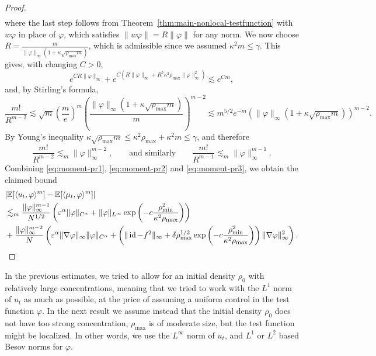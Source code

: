 \documentclass[a4paper,12pt]{article}
\begin{document}
\begin{proof}
\begin{align}
\end{align}
where the last step follows from Theorem~\ref{thm:main-nonlocal-testfunction} with $w\varphi$ in place of $\varphi$, which satisfies $\|w\varphi\| = R \|\varphi\|$ for any norm. We now choose $R = \tfrac{m}{\|\varphi\|_\infty(1+\kappa\sqrt{\rho_{\max}m})}$, which is admissible since we assumed $\kappa^2 m \leq \gamma$. This gives, with changing $C>0$,
\begin{equation}\label{eq:moment-pr2}
    e^{C R\| \varphi \|_{\infty}} + e^{C (R\| \varphi \|_{\infty} + R^2\kappa^2 \rho_{\max}\| \varphi \|_{\infty}^2 )} \lesssim e^{C m},
\end{equation}
and, by Stirling's formula,
\[
    \frac{m!}{R^{m-2}} \lesssim \sqrt{m} \left(\frac{m}{e}\right)^m\left(\frac{\|\varphi\|_\infty(1+\kappa\sqrt{\rho_{\max}m})}{m}\right)^{m-2} \lesssim m^{5/2} e^{-m} (\|\varphi\|_\infty(1+\kappa\sqrt{\rho_{\max}m}))^{m-2}.
\]
By Young's inequality $\kappa \sqrt{\rho_{\max} m} \leq \kappa^2 \rho_{\max} + \kappa^2 m \leq \gamma$,   
and therefore
\begin{equation}\label{eq:moment-pr3}
    \frac{m!}{R^{m-2}} \lesssim_m \|\varphi\|_\infty^{m-2},\qquad \text{and similarly} \qquad \frac{m!}{R^{m-1}} \lesssim_m \|\varphi\|_\infty^{m-1}.
\end{equation}
Combining \eqref{eq:moment-pr1}, \eqref{eq:moment-pr2} and \eqref{eq:moment-pr3}, we obtain the claimed bound
\begin{align*}
  &| \mathbb{E} [\langle u_t, \varphi \rangle^m] -\mathbb{E} [\langle \mu_t,
  \varphi \rangle^m] | \\
    & \lesssim_m \frac{\|\varphi\|_\infty^{m-1}}{N^{1/2}} \left(\varepsilon^\alpha \|\varphi\|_{C^\alpha}
        + \|\varphi\|_{L^\infty} 
        \exp\left(-c \frac{\rho_{\min}^2}{\kappa^2\rho_{\max}}\right)\right)\\ \nonumber
    & + \frac{\|\varphi\|_\infty^{m-2}}{N} \left(\varepsilon^{\alpha} \|\nabla \varphi\|_\infty \| \varphi \|_{C^{\alpha}} + \left(\| \operatorname{id} - f^2 \|_{\infty} + \delta \rho_{\max}^{1/2} \exp\left(-c \frac{\rho_{\min}^2}{\kappa^2\rho_{\max}}\right)\right) \| \nabla \varphi \|_{\infty}^2\right). \qedhere
\end{align*}
\end{proof}


In the previous estimates, we tried to allow for an initial density $\rho_0$ with relatively large concentrations, meaning that we tried to work with the $L^1$ norm of $u_t$ as much as possible, at the price of assuming a uniform control in the test function $\varphi$. In the next result we assume instead that the initial density $\rho_0$ does not have too strong concentration, $\rho_{\max}$ is of moderate size, but the test function might be localized. In other words, we use the $L^\infty$ norm of $u_t$, and $L^1$ or $L^2$ based Besov norms for $\varphi$.
\end{document}
